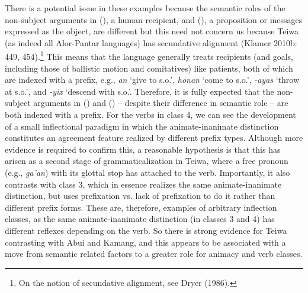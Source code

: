 There is a potential issue in these examples because the semantic roles of the non-subject arguments in (), a human recipient, and (), a proposition or messages expressed as the object, are different but this need not concern us because Teiwa (as indeed all Alor-Pantar languages) has secundative alignment (Klamer 2010b: 449, 454).\footnote{On the notion of secundative alignment, see Dryer (1986).} This means that the language generally treats recipients (and goals, including those of ballistic motion and comitatives) like patients, both of which are indexed with a prefix, e.g., \textit{an} {\textquoteleft}give to s.o.{\textquoteright}, \textit{honan} {\textquoteleft}come to s.o.{\textquoteright}, \textit{{}-ayas} {\textquoteleft}throw at s.o.{\textquoteright}, and \textit{{}-yix} {\textquoteleft}descend with s.o.{\textquoteright}. Therefore, it is fully expected that the non-subject arguments in () and () -- despite their difference in semantic role -- are both indexed with a prefix. For the verbs in class 4,
 we can see the development of a small inflectional paradigm in which the animate-inanimate distinction constitutes an agreement feature realized by different prefix types. Although more evidence is required to confirm this, a reasonable hypothesis is that this has arisen as a second stage of grammaticalization in Teiwa, where a free pronoun (e.g., \textit{ga{\textquoteright}an}) with its glottal stop has attached to the verb. Importantly, it also contrasts with class 3, which in essence realizes the same animate-inanimate distinction, but uses prefixation vs. lack of prefixation to do it rather than different prefix forms. These are, therefore, examples of arbitrary inflection classes, as the same animate-inanimate distinction (in classes 3 and 4) has different reflexes depending on the verb. So there is strong evidence for Teiwa contrasting with Abui and Kamang, and this appears to be associated with a move from semantic related factors to a greater role for animacy and verb classes. 

